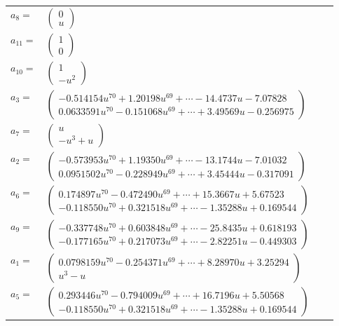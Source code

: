 \documentclass[1p]{elsarticle_modified}
\theoremstyle{definition}
\begin{document}
\begin{tabular}{m{7pt} m{180pt} m{7pt} m{180pt} }
\flushright $a_{8}=$&$\begin{pmatrix}0\\u\end{pmatrix}$ \\
\flushright $a_{11}=$&$\begin{pmatrix}1\\0\end{pmatrix}$ \\
\flushright $a_{10}=$&$\begin{pmatrix}1\\- u^2\end{pmatrix}$ \\
\flushright $a_{3}=$&$\begin{pmatrix}-0.514154 u^{70}+1.20198 u^{69}+\cdots-14.4737 u-7.07828\\0.0633591 u^{70}-0.151068 u^{69}+\cdots+3.49569 u-0.256975\end{pmatrix}$ \\
\flushright $a_{7}=$&$\begin{pmatrix}u\\- u^3+u\end{pmatrix}$ \\
\flushright $a_{2}=$&$\begin{pmatrix}-0.573953 u^{70}+1.19350 u^{69}+\cdots-13.1744 u-7.01032\\0.0951502 u^{70}-0.228949 u^{69}+\cdots+3.45444 u-0.317091\end{pmatrix}$ \\
\flushright $a_{6}=$&$\begin{pmatrix}0.174897 u^{70}-0.472490 u^{69}+\cdots+15.3667 u+5.67523\\-0.118550 u^{70}+0.321518 u^{69}+\cdots-1.35288 u+0.169544\end{pmatrix}$ \\
\flushright $a_{9}=$&$\begin{pmatrix}-0.337748 u^{70}+0.603848 u^{69}+\cdots-25.8435 u+0.618193\\-0.177165 u^{70}+0.217073 u^{69}+\cdots-2.82251 u-0.449303\end{pmatrix}$ \\
\flushright $a_{1}=$&$\begin{pmatrix}0.0798159 u^{70}-0.254371 u^{69}+\cdots+8.28970 u+3.25294\\u^3- u\end{pmatrix}$ \\
\flushright $a_{5}=$&$\begin{pmatrix}0.293446 u^{70}-0.794009 u^{69}+\cdots+16.7196 u+5.50568\\-0.118550 u^{70}+0.321518 u^{69}+\cdots-1.35288 u+0.169544\end{pmatrix}$ \\

\end{tabular}
\end{document}
